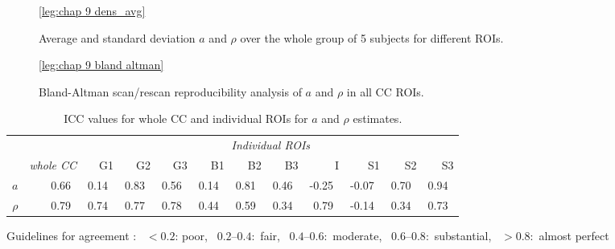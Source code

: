 \begin{figure}[ht]
	\centering
	\ref{leg:chap 9 dens_avg}\\	
	\caption{Average and standard deviation $a$ and $\rho$ over the whole group of 5 subjects for different ROIs.}
	\label{fig:chap9 scan rescan averages}
\end{figure}

\begin{figure}[ht]
	\centering
	\ref{leg:chap 9 bland altman}	
	\caption{Bland-Altman scan/rescan reproducibility analysis of $a$ and $\rho$ in all CC ROIs.}
	\label{fig:chap9 bland altman plot}	
\end{figure}	



\begin{table}[ht]
\caption{ICC values for whole CC and individual ROIs for $a$ and $\rho$ estimates.}
\label{tab:chapter9 ICC table}
\begin{adjustbox}{width={\textwidth},totalheight=\textheight,keepaspectratio}
\begin{tabular}{rrrrrrrrrrrr}
      \toprule
       & & \multicolumn{10}{c}{\textit{Individual ROIs}}                                             \\
       & \textit{whole CC} & G1    & G2    & G3    & B1    & B2    & B3    & I     & S1    & S2    & S3\\
       \cmidrule(rl){2-2} \cmidrule(l){3-12}
       \addlinespace
$a$    & 0.66~\usebox{\substantialBox} & 0.14~\usebox{\poorBox}  & 0.83~\usebox{\perfectBox} & 0.56~\usebox{\moderateBox}  & 0.14~\usebox{\poorBox}  & 0.81~\usebox{\perfectBox}  & 0.46~\usebox{\moderateBox}  & -0.25~\usebox{\poorBox} & -0.07~\usebox{\poorBox} & 0.70~\usebox{\substantialBox}  & 0.94~\usebox{\perfectBox}  \\
$\rho$ & 0.79~\usebox{\substantialBox} & 0.74~\usebox{\substantialBox}  & 0.77~\usebox{\substantialBox}  & 0.78~\usebox{\substantialBox}  & 0.44~\usebox{\moderateBox}  & 0.59~\usebox{\moderateBox}  & 0.34~\usebox{\fairBox}  & 0.79~\usebox{\substantialBox}  & -0.14~\usebox{\poorBox} & 0.34~\usebox{\fairBox}  & 0.73~\usebox{\substantialBox}  \\
\bottomrule
\end{tabular}
\end{adjustbox}
{\footnotesize Guidelines for agreement  \citep{Landis:1977}: \usebox{\poorBox}~$<0.2$: poor,  \usebox{\fairBox}~$0.2–0.4$:~fair,  \usebox{\moderateBox}~$0.4–0.6$:~moderate, \usebox{\substantialBox}~$0.6–0.8$:~substantial,  \usebox{\perfectBox}~$>0.8$:~almost perfect}
\end{table}

